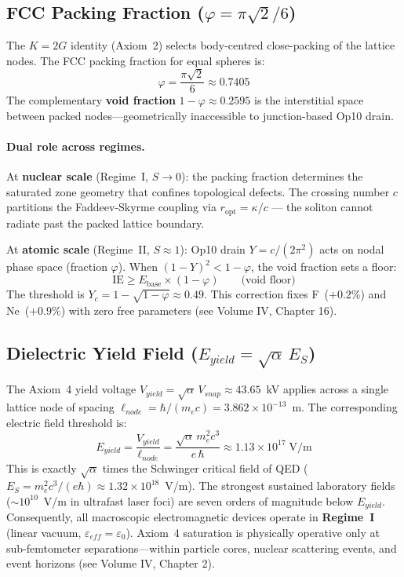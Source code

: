 \subsection{FCC Packing Fraction ($\varphi = \pi\sqrt{2}/6$)}

The $K = 2G$ identity (Axiom~2) selects body-centred close-packing
of the lattice nodes.  The FCC packing fraction for equal spheres is:
\begin{equation}
    \varphi = \frac{\pi\sqrt{2}}{6} \approx 0.7405
\end{equation}
The complementary \textbf{void fraction} $1 - \varphi \approx 0.2595$ is the
interstitial space between packed nodes---geometrically inaccessible
to junction-based Op10 drain.

\paragraph{Dual role across regimes.}
At \textbf{nuclear scale} (Regime~I, $S \to 0$): the packing fraction
determines the saturated zone geometry that confines topological defects.
The crossing number $c$ partitions the Faddeev-Skyrme coupling via
$r_\text{opt} = \kappa/c$ --- the soliton cannot radiate past the packed
lattice boundary.

At \textbf{atomic scale} (Regime~II, $S \approx 1$): Op10 drain
$Y = c/(2\pi^2)$ acts on nodal phase space (fraction $\varphi$).
When $(1 - Y)^2 < 1 - \varphi$, the void fraction sets a floor:
\begin{equation}
    \text{IE} \geq E_\text{base} \times (1 - \varphi)
    \qquad \text{(void floor)}
\end{equation}
The threshold is $Y_c = 1 - \sqrt{1 - \varphi} \approx 0.49$.
This correction fixes F~($+0.2\%$) and Ne~($+0.9\%$) with zero
free parameters (see Volume IV, Chapter 16).

\subsection{Dielectric Yield Field ($E_{yield} = \sqrt{\alpha}\, E_S$)}

The Axiom~4 yield voltage $V_{yield} = \sqrt{\alpha}\, V_{snap} \approx 43.65$~kV applies across a single lattice node of spacing $\ell_{node} = \hbar/(m_e c) = 3.862 \times 10^{-13}$~m. The corresponding electric field threshold is:
\begin{equation}
    E_{yield} = \frac{V_{yield}}{\ell_{node}} = \frac{\sqrt{\alpha}\, m_e^2 c^3}{e\, \hbar} \approx 1.13 \times 10^{17}\;\text{V/m}
\end{equation}
This is exactly $\sqrt{\alpha}$ times the Schwinger critical field of QED ($E_S = m_e^2 c^3 / (e\hbar) \approx 1.32 \times 10^{18}$~V/m). The strongest sustained laboratory fields ($\sim 10^{10}$~V/m in ultrafast laser foci) are seven orders of magnitude below $E_{yield}$. Consequently, all macroscopic electromagnetic devices operate in \textbf{Regime~I} (linear vacuum, $\varepsilon_{eff} = \varepsilon_0$). Axiom~4 saturation is physically operative only at sub-femtometer separations---within particle cores, nuclear scattering events, and event horizons (see Volume IV, Chapter 2).

